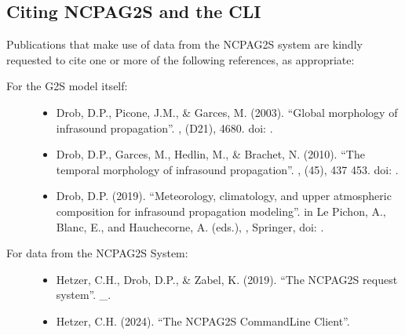 \documentclass[letterpaper,10pt,english]{sphinxmanual}
\begin{document}
\subsection{Citing NCPA\sphinxhyphen{}G2S and the CLI}
\label{\detokenize{authorship:citing-ncpa-g2s-and-the-cli}}
\sphinxAtStartPar
Publications that make use of data from the NCPA\sphinxhyphen{}G2S system are kindly requested to cite one or more of the following references, as appropriate:
\begin{description}
\item[{For the G2S model itself:}] \leavevmode\begin{itemize}
\item {} 
\sphinxAtStartPar
Drob, D.P., Picone, J.M., \& Garces, M. (2003). “Global morphology of infrasound propagation”. ,  (D21), 4680. doi: .

\item {} 
\sphinxAtStartPar
Drob, D.P., Garces, M., Hedlin, M., \& Brachet, N. (2010). “The temporal morphology of infrasound propagation”. ,  (4\sphinxhyphen{}5), 437 \textendash{} 453. doi: .

\item {} 
\sphinxAtStartPar
Drob, D.P. (2019). “Meteorology, climatology, and upper atmospheric composition for infrasound propagation modeling”. in Le Pichon, A., Blanc, E., and Hauchecorne, A. (eds.), , Springer, doi: .

\end{itemize}

\item[{For data from the NCPA\sphinxhyphen{}G2S System:}] \leavevmode\begin{itemize}
\item {} 
\sphinxAtStartPar
Hetzer, C.H., Drob, D.P., \& Zabel, K. (2019). “The NCPA\sphinxhyphen{}G2S request system”.   \_.

\item {} 
\sphinxAtStartPar
Hetzer, C.H. (2024). “The NCPAG2S Command\sphinxhyphen{}Line Client”.

\end{itemize}

\end{description}
\end{document}
